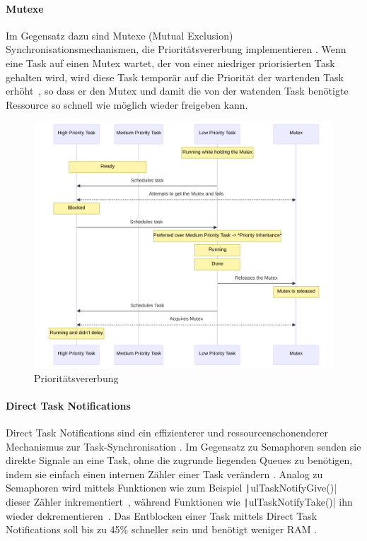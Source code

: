 \paragraph{Mutexe} \label{sec:mutex}

Im Gegensatz dazu sind Mutexe (Mutual Exclusion) Synchronisationsmechanismen,
die Prioritätsvererbung implementieren \cite{freertos_mutexes}. Wenn eine Task
auf einen Mutex wartet, der von einer niedriger priorisierten Task gehalten
wird, wird diese Task temporär auf die Priorität der wartenden Task
erhöht~\cite{FreertosForumSemphMtx}, so dass er den Mutex und damit die von der
watenden Task benötigte Ressource so schnell wie möglich wieder freigeben kann.

\begin{figure}[htb]
    \centering
    \includegraphics[width=1\textwidth]{assets/prio_inheritance}
    \caption{Prioritätsvererbung}
\end{figure}

\paragraph{Direct Task Notifications} \label{sec:direct_task_notification}

Direct Task Notifications sind ein effizienterer und ressourcenschonenderer
Mechanismus zur Task-Synchronisation \cite{freertos_task_notifications_desc}. Im
Gegensatz zu Semaphoren senden sie direkte Signale an eine Task, ohne die
zugrunde liegenden Queues zu benötigen, indem sie einfach einen internen Zähler
einer Task verändern \cite{freertos_tasks_c_213}. Analog zu Semaphoren wird
mittels Funktionen wie zum Beispiel \texttt|ulTaskNotifyGive()| dieser
Zähler inkrementiert~\cite{freertos_tasks_c_4296}, während Funktionen wie
\texttt|ulTaskNotifyTake()| ihn wieder
dekrementieren~\cite{freertos_tasks_c_3926}. Das Entblocken einer Task mittels
Direct Task Notifications soll bis zu 45\% schneller sein und benötigt weniger
RAM \cite{freertos_task_notifications_usage}.

